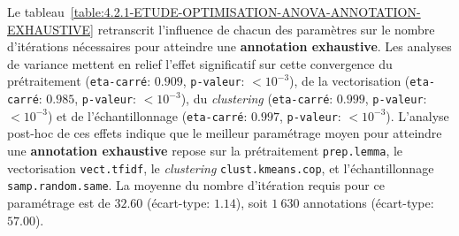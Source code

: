 			Le tableau~\ref{table:4.2.1-ETUDE-OPTIMISATION-ANOVA-ANNOTATION-EXHAUSTIVE} retranscrit l'influence de chacun des paramètres sur le nombre d'itérations nécessaires pour atteindre une \textbf{annotation exhaustive}.
			Les analyses de variance mettent en relief l'effet significatif sur cette convergence du prétraitement (\texttt{eta-carré}: $0.909$, \texttt{p-valeur}: $< 10^{-3}$), de la vectorisation (\texttt{eta-carré}: $0.985$, \texttt{p-valeur}: $< 10^{-3}$), du \textit{clustering} (\texttt{eta-carré}: $0.999$, \texttt{p-valeur}: $< 10^{-3}$) et de l'échantillonnage (\texttt{eta-carré}: $0.997$, \texttt{p-valeur}: $< 10^{-3}$).
			L'analyse post-hoc de ces effets indique que le meilleur paramétrage moyen pour atteindre une \textbf{annotation exhaustive} repose sur la prétraitement \texttt{prep.lemma}, le vectorisation \texttt{vect.tfidf}, le \textit{clustering} \texttt{clust.kmeans.cop}, et l'échantillonnage \texttt{samp.random.same}. La moyenne du nombre d'itération requis pour ce paramétrage est de $32.60$ (écart-type: $1.14$), soit $1~630$ annotations (écart-type: $57.00$).
